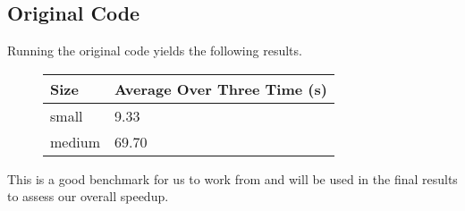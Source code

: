 \subsection{Original Code}
Running the original code yields the following results.\\
\begin{figure}[H]\centering \begin{tabular}{ l | l }
  \hline
  Size & Average Over Three Time (s) \\
  \hline
  \hline
  small & 9.33 \\
  medium & 69.70 \\
  \hline
\end{tabular} \end{figure}

This is a good benchmark for us to work from and will be used in the final results to assess our overall speedup.